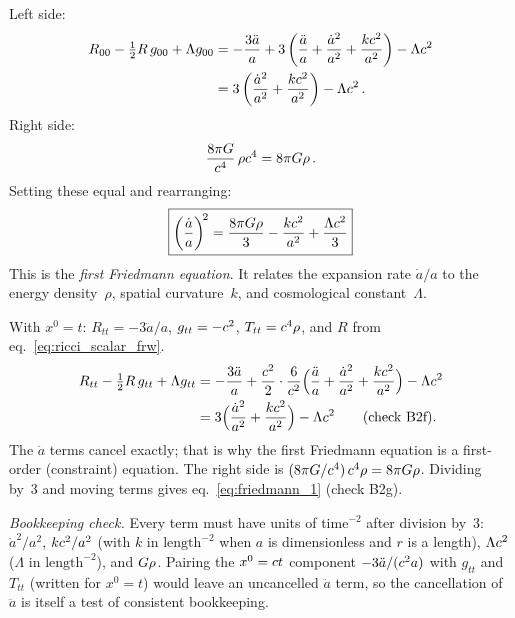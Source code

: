 \noindent Left side:
\begin{align}
    R_{00} - \tfrac{1}{2} R\, g_{00} + \Lambda g_{00}
    &= -\frac{3\ddot{a}}{a}
    + 3\left(\frac{\ddot{a}}{a}
    + \frac{\dot{a}^2}{a^2} + \frac{kc^2}{a^2}\right)
    - \Lambda c^2 \nonumber \\
    &= 3\left(\frac{\dot{a}^2}{a^2}
    + \frac{kc^2}{a^2}\right) - \Lambda c^2 \,.
    \label{eq:lhs_00}
\end{align}
Right side:
\begin{equation}
    \frac{8\pi G}{c^4}\, \rho c^4
    = 8\pi G\rho \,.
    \label{eq:rhs_00}
\end{equation}
Setting these equal and rearranging:
\begin{equation}
    \boxed{
    \left(\frac{\dot{a}}{a}\right)^{\!2}
    = \frac{8\pi G\rho}{3}
    - \frac{kc^2}{a^2}
    + \frac{\Lambda c^2}{3}
    }
    \label{eq:friedmann_1}
\end{equation}
This is the \emph{first Friedmann equation}.  It relates the expansion
rate $\dot{a}/a$ to the energy density~$\rho$, spatial curvature~$k$,
and cosmological constant~$\Lambda$.


\begin{derivation}
With $x^0 = t$: $R_{tt} = -3\ddot a/a$, $g_{tt} = -c^2$,
$T_{tt} = c^4\rho$, and $R$ from eq.~\eqref{eq:ricci_scalar_frw}.
\begin{align*}
  R_{tt} - \tfrac12 R\,g_{tt} + \Lambda g_{tt}
  &= -\frac{3\ddot a}{a}
     + \frac{c^2}{2}\cdot\frac{6}{c^2}
       \Bigl(\frac{\ddot a}{a} + \frac{\dot a^2}{a^2} + \frac{kc^2}{a^2}\Bigr)
     - \Lambda c^2 \\
  &= 3\Bigl(\frac{\dot a^2}{a^2} + \frac{kc^2}{a^2}\Bigr)
     - \Lambda c^2
  \qquad(\text{check B2f}).
\end{align*}
The $\ddot a$ terms cancel exactly; that is why the first Friedmann equation is a
first-order (constraint) equation.  The right side is
$(8\pi G/c^4)\,c^4\rho = 8\pi G\rho$.
Dividing by~3 and moving terms gives eq.~\eqref{eq:friedmann_1} (check B2g).

\textit{Bookkeeping check.}  Every term must have units of $\text{time}^{-2}$
after division by~3: $\dot a^2/a^2$, $kc^2/a^2$ (with $k$ in
$\text{length}^{-2}$ when $a$ is dimensionless and $r$ is a length),
$\Lambda c^2$ ($\Lambda$ in $\text{length}^{-2}$), and
$G\rho$.  Pairing the $x^0 = c t$ component
$-3\ddot a/(c^2 a)$ with $g_{tt}$ and $T_{tt}$ (written for
$x^0 = t$) would leave an uncancelled $\ddot a$ term, so the cancellation of
$\ddot a$ is itself a test of consistent bookkeeping.
\end{derivation}
